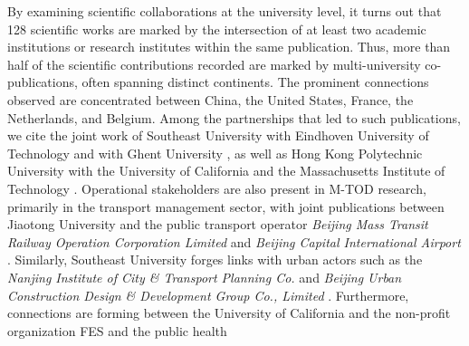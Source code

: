 \begin{refsegment}
By examining scientific collaborations at the university level, it turns out that 128 scientific works are marked by the intersection of at least two academic institutions or research institutes within the same publication. Thus, more than half of the scientific contributions recorded are marked by multi-university co-publications, often spanning distinct continents. The prominent connections observed are concentrated between China, the United States, France, the Netherlands, and Belgium. Among the partnerships that led to such publications, we cite the joint work of Southeast University with Eindhoven University of Technology \textcolor{blue}{\autocite[]{gan_associations_2021, liu_use_2020, liu_understanding_2020}} and with Ghent University \textcolor{blue}{\autocite[]{chen_what_2022, cheng_comparison_2023, cheng_exploring_2022}}, as well as Hong Kong Polytechnic University with the University of California \textcolor{blue}{\autocite{wu_optimal_2020}} and the Massachusetts Institute of Technology \textcolor{blue}{\autocite{cao_e-scooter_2021}}. Operational stakeholders are also present in \acrshort{M-TOD} research, primarily in the transport management sector, with joint publications between Jiaotong University and the public transport operator \textsl{Beijing Mass Transit Railway Operation Corporation Limited} \textcolor{blue}{\autocite{wang_interchange_2016}} and \textsl{Beijing Capital International Airport} \textcolor{blue}{\autocite{fan_how_2019}}. Similarly, Southeast University forges links with urban actors such as the \textsl{Nanjing Institute of City \& Transport Planning Co.} \textcolor{blue}{\autocite{zhong_layout_2021}} and \textsl{Beijing Urban Construction Design \& Development Group Co., Limited} \textcolor{blue}{\autocite{yang_empirical_2016}}. Furthermore, connections are forming between the University of California and the non-profit organization \acrfull{FES} and the public health 
\end{refsegment}
